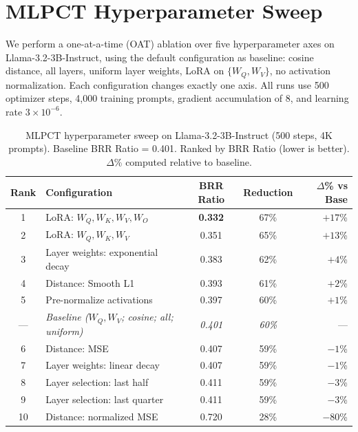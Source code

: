 
\section{MLPCT Hyperparameter Sweep}
\label{app:sweep}

We perform a one-at-a-time (OAT) ablation over five hyperparameter axes on Llama-3.2-3B-Instruct, using the default configuration as baseline: cosine distance, all layers, uniform layer weights, LoRA on $\{W_Q, W_V\}$, no activation normalization. Each configuration changes exactly one axis. All runs use 500 optimizer steps, 4,000 training prompts, gradient accumulation of 8, and learning rate $3 \times 10^{-6}$.

\begin{table}[h]
\centering
\caption{MLPCT hyperparameter sweep on Llama-3.2-3B-Instruct (500 steps, 4K prompts). Baseline BRR Ratio = 0.401. Ranked by BRR Ratio (lower is better). $\Delta$\% computed relative to baseline.}
\label{tab:sweep}
\small
\begin{tabular}{clccr}
\toprule
\textbf{Rank} & \textbf{Configuration} & \textbf{BRR Ratio} & \textbf{Reduction} & \textbf{$\Delta$\% vs Base} \\
\midrule
1 & LoRA: $W_Q, W_K, W_V, W_O$ & \textbf{0.332} & 67\% & $+17$\% \\
2 & LoRA: $W_Q, W_K, W_V$ & 0.351 & 65\% & $+13$\% \\
3 & Layer weights: exponential decay & 0.383 & 62\% & $+4$\% \\
4 & Distance: Smooth L1 & 0.393 & 61\% & $+2$\% \\
5 & Pre-normalize activations & 0.397 & 60\% & $+1$\% \\
\midrule
--- & \textit{Baseline ($W_Q, W_V$; cosine; all; uniform)} & \textit{0.401} & \textit{60\%} & --- \\
\midrule
6 & Distance: MSE & 0.407 & 59\% & $-1$\% \\
7 & Layer weights: linear decay & 0.407 & 59\% & $-1$\% \\
8 & Layer selection: last half & 0.411 & 59\% & $-3$\% \\
9 & Layer selection: last quarter & 0.411 & 59\% & $-3$\% \\
10 & Distance: normalized MSE & 0.720 & 28\% & $-80$\% \\
\bottomrule
\end{tabular}
\end{table}

